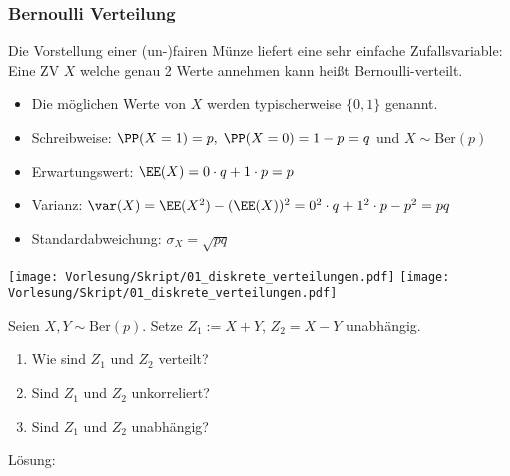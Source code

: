 \documentclass{scrreprt}
\renewenvironment{anumerate}{\begin{enumerate}[label=(\alph*)]}{\end{enumerate}} %
\begin{document}
\subsubsection{Bernoulli Verteilung}
Die Vorstellung einer (un-)fairen Münze liefert eine sehr einfache Zufallsvariable:
 Eine ZV $X$ welche genau 2 Werte annehmen kann heißt Bernoulli-verteilt.
\begin{itemize}
\item Die möglichen Werte von $X$ werden typischerweise $\{0,1\}$ genannt.
\item Schreibweise: $\PP(X=1)=p, \; \PP(X=0)=1-p=q$ und $X \sim \mathrm{Ber}(p)$
\item Erwartungswert: $\EE(X)=0\cdot q + 1 \cdot p = p$
\item Varianz: $\var (X) = \EE(X^2) - (\EE(X))^2 = 0^2 \cdot q + 1^2 \cdot p - p^2 = pq$
\item Standardabweichung: $\sigma_X=\sqrt{pq}$
\end{itemize}
\begin{center}
\texttt{[image: Vorlesung/Skript/01\_diskrete\_verteilungen.pdf]}
\texttt{[image: Vorlesung/Skript/01\_diskrete\_verteilungen.pdf]}
\end{center}
 Seien $X,Y \sim \mathrm{Ber}(p)$. Setze $Z_1:= X+Y$, $Z_2=X-Y$ unabhängig.
\begin{anumerate}
\item Wie sind $Z_1$ und $Z_2$ verteilt?
\item Sind $Z_1$ und $Z_2$ unkorreliert?
\item Sind $Z_1$ und $Z_2$ unabhängig?
\end{anumerate}
Lösung:
\end{document}
